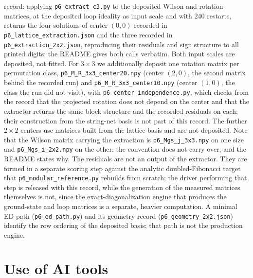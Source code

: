 \documentclass[aps,pra,twocolumn,superscriptaddress,longbibliography,floatfix,nofootinbib]{revtex4-2}
\begin{document}
record: applying \texttt{p6\_extract\_c3.py} to the deposited Wilson and rotation
matrices, at the deposited loop ideality as input scale and with 240 restarts,
returns the four solutions of center $(0,0)$ recorded in
\texttt{p6\_lattice\_extraction.json} and the three recorded in
\texttt{p6\_extraction\_2x2.json}, reproducing their residuals and sign structure to
all printed digits; the README gives both calls verbatim. Both input scales are
deposited, not fitted. For $3\times3$ we additionally deposit one rotation
matrix per permutation class, \texttt{p6\_M\_R\_3x3\_center20.npy} (center
$(2,0)$, the second matrix behind the recorded run) and
\texttt{p6\_M\_R\_3x3\_center10.npy} (center $(1,0)$, the class the run did not
visit), with \texttt{p6\_center\_independence.py}, which checks from the record
that the projected rotation does not depend on the center and that the extractor
returns the same block structure and the recorded residuals on each; their
construction from the string-net basis is not part of this record. The further
$2\times2$ centers use matrices built from the lattice basis and are not
deposited. Note that the
Wilson matrix carrying the extraction is \texttt{p6\_Mgs\_j\_3x3.npy} on one size
and \texttt{p6\_Mgs\_i\_2x2.npy} on the other: the convention does not carry over,
and the README states why. The residuals
are not an output of the extractor. They are formed in a separate scoring step
against the analytic doubled-Fibonacci target that
\texttt{p6\_modular\_reference.py} rebuilds from scratch; the driver performing
that step is released with this record, while the generation of the measured
matrices themselves is not, since the exact-diagonalization engine that produces
the ground-state and loop matrices is a separate, heavier computation. A minimal
ED path (\texttt{p6\_ed\_path.py}) and its geometry record
(\texttt{p6\_geometry\_2x2.json}) identify the row ordering of the deposited
basis; that path is not the production engine.

\section*{Use of AI tools}
\end{document}
